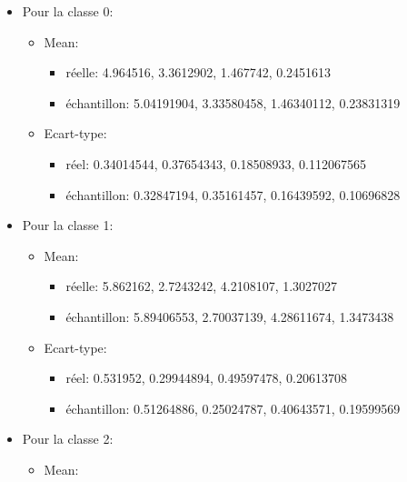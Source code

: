 \documentclass[
]{article}
\providecommand{\tightlist}{%
  \setlength{\itemsep}{0pt}\setlength{\parskip}{0pt}}
\begin{document}
\begin{itemize}
\tightlist
\item
  Pour la classe 0:

  \begin{itemize}
  \tightlist
  \item
    Mean:

    \begin{itemize}
    \tightlist
    \item
      réelle: 4.964516, 3.3612902, 1.467742, 0.2451613
    \item
      échantillon: 5.04191904, 3.33580458, 1.46340112, 0.23831319
    \end{itemize}
  \item
    Ecart-type:

    \begin{itemize}
    \tightlist
    \item
      réel: 0.34014544, 0.37654343, 0.18508933, 0.112067565
    \item
      échantillon: 0.32847194, 0.35161457, 0.16439592, 0.10696828
    \end{itemize}
  \end{itemize}
\item
  Pour la classe 1:

  \begin{itemize}
  \tightlist
  \item
    Mean:

    \begin{itemize}
    \tightlist
    \item
      réelle: 5.862162, 2.7243242, 4.2108107, 1.3027027
    \item
      échantillon: 5.89406553, 2.70037139, 4.28611674, 1.3473438
    \end{itemize}
  \item
    Ecart-type:

    \begin{itemize}
    \tightlist
    \item
      réel: 0.531952, 0.29944894, 0.49597478, 0.20613708
    \item
      échantillon: 0.51264886, 0.25024787, 0.40643571, 0.19599569
    \end{itemize}
  \end{itemize}
\item
  Pour la classe 2:

  \begin{itemize}
  \tightlist
  \item
    Mean:


\end{itemize}
\end{itemize}
\end{document}
